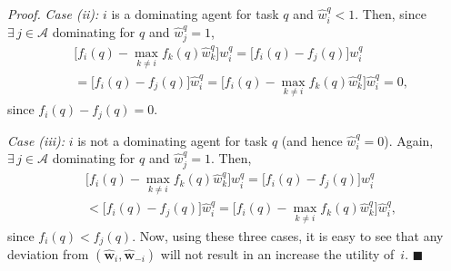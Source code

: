 \documentclass{IEEEtran}
\newcommand{\Mcal}[1]{\mathcal{#1}}
\newcommand{\bld}[1]{\mathbf{#1}}
\newcommand{\squaresym}{\hbox{$\blacksquare$}}
\newcommand{\proofend}{\relax\ifmmode\else\unskip\hfill\fi\squaresym}
\renewenvironment{proof}{\textit{Proof.} }{\proofend}
\renewcommand{\hat}[1]{\widehat{#1}}
\newcommand{\marginn}[1]{\marginpar{\color{blue}\tiny\ttfamily#1}}
\newcommand{\margin}[1]{\marginpar{\color{magenta}\tiny\ttfamily#1}}
\def \agt{\Mcal{A}}
\def \w{\bld{w}}
\def \what{\hat{w}}
\begin{document}
\begin{proof}
        \emph{Case (ii):} $i$ is a dominating agent for task $q$ and ${\what^q_i < 1}$. Then, since $\exists \, j \in \agt$ dominating for $q$ and $\what^q_j = 1$,
\begin{align*}
	& \Big[f_i(q) - \max_{k \neq i} f_k(q)\what^q_k \Big]w^q_i = \big[ f_i(q) - f_j(q) \big] w^q_i \\ 
	& =	\big[ f_i(q) - f_j(q) \big] \what^q_i = \Big[f_i(q) - \max_{k \neq i} f_k(q)\what^q_k \Big] \what^q_i = 0,
\end{align*}
	since $f_i(q) - f_j(q) = 0$.
	
        \emph{Case (iii):} $i$ is not a dominating agent for task $q$ (and hence $\what^q_i = 0$).
	Again, $\exists \, j \in \agt$ dominating for $q$ and $\what^q_j = 1$. Then,
\begin{align*}
	 & \Big[f_i(q) - \max_{k \neq i} f_k(q)\what^q_k \Big]w^q_i = \big[ f_i(q) - f_j(q) \big] w^q_i \\
	 & < \big[ f_i(q) - f_j(q) \big] \what^q_i = \Big[f_i(q) - \max_{k \neq i} f_k(q)\what^q_k \Big] \what^q_i,
\end{align*}
	since $f_i(q) < f_j(q)$.
Now, using these three cases, it is
        easy to see that any deviation from
        $(\hat{\w}_i,\hat{\w}_{-i})$ will not result in an increase
        the utility
        of~$i$. %
\end{proof}
\end{document}
